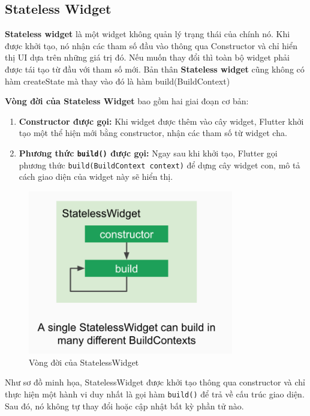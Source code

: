 \documentclass[../DoAn.tex]{subfiles}
\numberwithin{figure}{chapter}
\begin{document}
\subsection{Stateless Widget}
\textbf{Stateless widget} là một widget không quản lý trạng thái của chính nó. Khi được khởi tạo, nó nhận các tham số đầu vào thông qua Constructor và chỉ hiển thị UI dựa trên những giá trị đó. Nếu muốn thay đổi thì toàn bộ widget phải được tái tạo từ đầu với tham số mới. Bản thân \textbf{Stateless widget} cũng không có hàm createState mà thay vào đó là hàm build(BuildContext)

\textbf{Vòng đời của Stateless Widget} bao gồm hai giai đoạn cơ bản:

\begin{enumerate}
\item \textbf{Constructor được gọi:} Khi widget được thêm vào cây widget, Flutter khởi tạo một thể hiện mới bằng constructor, nhận các tham số từ widget cha.
\item \textbf{Phương thức \texttt{build()} được gọi:} Ngay sau khi khởi tạo, Flutter gọi phương thức \texttt{build(BuildContext context)} để dựng cây widget con, mô tả cách giao diện của widget này sẽ hiển thị.
\end{enumerate}
\begin{figure}[H]
    \centering
    \includegraphics[width=0.8\textwidth]{Hinhve/Chuong5/statelesswidgetimg.png}
    \caption{Vòng đời của StatelessWidget}
    \label{fig:statelesswidgetimg}
\end{figure}
Như sơ đồ minh họa, StatelessWidget được khởi tạo thông qua constructor và chỉ thực hiện một hành vi duy nhất là gọi hàm \texttt{build()} để trả về cấu trúc giao diện. Sau đó, nó không tự thay đổi hoặc cập nhật bất kỳ phần tử nào.
\end{document}
